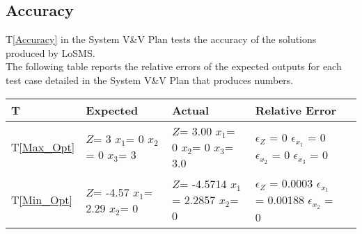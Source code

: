 \documentclass[12pt, titlepage]{article}
\newcommand{\famname}{LoSMS}
\begin{document}
\subsection{Accuracy}

T\ref{Accuracy} in the System V\&V Plan tests the accuracy of the solutions 
produced by \famname{}. \\

The following table reports the relative errors of the expected outputs for 
each test case detailed in the System V\&V Plan that produces numbers. \\

\noindent
\begin{tabularx}{\textwidth}{p{1.5cm}p{3cm}p{4.5cm}p{6cm}X}
	\toprule {\bf T} & {\bf Expected} & {\bf Actual} & {\bf Relative Error}\\
	\midrule
	T\ref{Max_Opt} & $Z$= 3 \newline
					 $x_1$= 0 \newline
					 $x_2$= 0 \newline
					 $x_3$= 3 \newline
				   & $Z$= 3.00 \newline
				     $x_1$= 0 \newline
				     $x_2$= 0 \newline
				     $x_3$= 3.0 \newline 
				   & $\epsilon_Z$ = 0 \newline
				     $\epsilon_{x_1}$ = 0 \newline 
				     $\epsilon_{x_2}$ = 0 \newline 
				     $\epsilon_{x_3}$ = 0 \newline  
				  \\
	T\ref{Min_Opt} & $Z$= -4.57 \newline
					 $x_1$= 2.29 \newline
					 $x_2$= 0 \newline
				   & $Z$= -4.5714 \newline
					 $x_1$= 2.2857 \newline
					 $x_2$= 0 \newline
				   & $\epsilon_Z$ = 0.0003 \newline
					 $\epsilon_{x_1}$ = 0.00188 \newline 
					 $\epsilon_{x_2}$ =  0\newline
				  \\ 
	\bottomrule
\end{tabularx}
\end{document}

